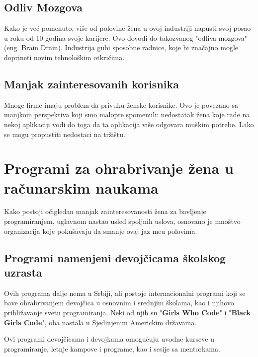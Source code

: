 \documentclass[12pt]{article}
\begin{document}
\subsection{Odliv Mozgova}

Kako je već pomenuto, više od polovine žena u ovoj industriji napusti svoj posao u roku od 10 godina svoje karijere. Ovo dovodi do takozvanog "odliva mozgova" (eng. Brain Drain). Industrija gubi sposobne radnice, koje bi značajno mogle doprineti novim tehnološkim otkrićima.

\subsection{Manjak zainteresovanih korisnika}

Mnoge firme imaju problem da privuku ženske korisnike. Ovo je povezano sa manjkom perspektiva koji smo malopre spomenuli: nedostatak žena koje rade na nekoj aplikaciji vodi do toga da ta aplikacija više odgovara muškim potrebe. Lako se mogu propustiti nedostaci na tržištu.


\newpage
\section{Programi za ohrabrivanje žena u računarskim naukama}

Kako postoji očigledan manjak zainteresovanosti žena za bavljenje programiranjem, uglavnom nastao usled spoljnih uslova, osnovano je mnoštvo organizacija koje pokušavaju da smanje ovaj jaz me\dj u polovima.

\subsection{Programi namenjeni devojčicama školskog uzrasta}

Ovih programa dalje nema u Srbiji, ali postoje internacionalni programi koji se bave ohrabrivanjem devojčica u osnovnim i srednjim školama, kao i njihovo približavanje svetu programiranja. Neki od njih su "\textbf{Girls Who Code}" i "\textbf{Black Girls Code}", oba nastala u Sjedinjenim Americkim državama.

Ovi programi devojčicama i devojkama omogućuju uvodne kurseve u programiranje, letnje kampove i programe, kao i sesije sa mentorkama.
\end{document}
